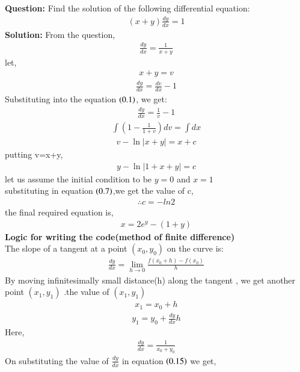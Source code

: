 \documentclass[journal]{IEEEtran}
\begin{document}
\textbf{Question:}  
Find the solution of the following differential equation:  
\begin{align*}
    (x + y) \frac{dy}{dx} = 1
\end{align*}
\textbf{Solution:}  
From the question, 
\begin{align}
\frac{dy}{dx}=\frac{1}{x+y}
\end{align}
let,
\begin{align}
    x+y=v
\end{align}
\begin{align}
    \frac{dy}{dx}=\frac{dv}{dx}-1
\end{align}
Substituting into the equation $\left(0.1\right)$, we get:
\begin{align}
    \frac{dy}{dx} = \frac{1}{v} - 1
\end{align}
\begin{align}
    \int(1- \frac{1}{1+v})dv = \int{dx}
\end{align}
\begin{align}
v-\ln |x+y|=x+c
\end{align}
putting v=x+y,
\begin{align}
    y-\ln|1+x+y|=c
\end{align}
let us assume  the initial condition to be $y=0$ and $x=1$\\
substituting in equation $\left(0.7\right)$,we get the value of c,
\begin{align}
\therefore c={-ln{2}}
\end{align}
the final required equation is,
\begin{align}
    x={2e^{y}-(1+y)}
\end{align}
\textbf{Logic for writing the code(method of finite difference)}
\\
The slope of a tangent at a point $(x_0, y_0)$ on the curve is: 
\begin{align} 
\frac{dy}{dx} = \lim_{h \to 0} \frac{f(x_0 + h) - f(x_0)}{h}
\end{align}
By moving infinitesimally small distance(h) along the tangent , we get another point $(x_1, y_1)$ .the value of $(x_1,y_1)$
\begin{align}
x_1=x_0+h
\end{align}
\begin{align}
y_1=y_0+\frac{dy}{dx}h
\end{align}
Here,
\begin{align}
    \frac{dy}{dx}=\frac{1}{x_0+y_0}
\end{align}
On substituting the value of $\frac{dy}{dx}$ in equation $\left(0.15\right)$ we get,
\end{document}
